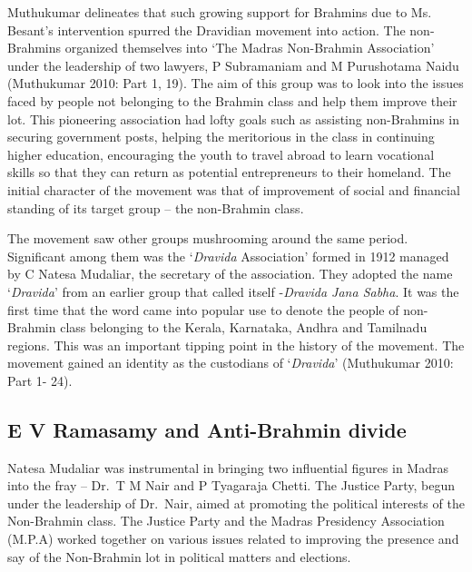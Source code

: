 Muthukumar delineates that such growing support for Brahmins due to Ms. Besant’s intervention spurred the Dravidian movement into action. The non-Brahmins organized themselves into ‘The Madras Non-Brahmin Association’ under the leadership of two lawyers, P Subramaniam and M Purushotama Naidu (Muthukumar 2010: Part 1, 19). The aim of this group was to look into the issues faced by people not belonging to the Brahmin class and help them improve their lot. This pioneering association had lofty goals such as assisting non-Brahmins in securing government posts, helping the meritorious in the class in continuing higher education, encouraging the youth to travel abroad to learn vocational skills so that they can return as potential entrepreneurs to their homeland. The initial character of the movement was that of improvement of social and financial standing of its target group – the non-Brahmin class.

The movement saw other groups mushrooming around the same period. Significant among them was the ‘\textit{Dravida} Association’ formed in 1912 managed by C Natesa Mudaliar, the secretary of the association. They adopted the name ‘\textit{Dravida}’ from an earlier group that called itself -\textit{Dravida Jana Sabha}. It was the first time that the word came into popular use to denote the people of non-Brahmin class belonging to the Kerala, Karnataka, Andhra and Tamilnadu regions. This was an important tipping point in the history of the movement. The movement gained an identity as the custodians of ‘\textit{Dravida}’ (Muthukumar 2010: Part 1- 24).


\subsection*{E V Ramasamy and Anti-Brahmin divide}

\vskip -6pt

Natesa Mudaliar was instrumental in bringing two influential figures in Madras into the fray – Dr.\ T M Nair and P Tyagaraja Chetti. The Justice Party, begun under the leadership of Dr.\ Nair, aimed at promoting the political interests of the Non-Brahmin class. The Justice Party and the Madras Presidency Association (M.P.A) worked together on various issues related to improving the presence and say of the Non-Brahmin lot in political matters and elections.

